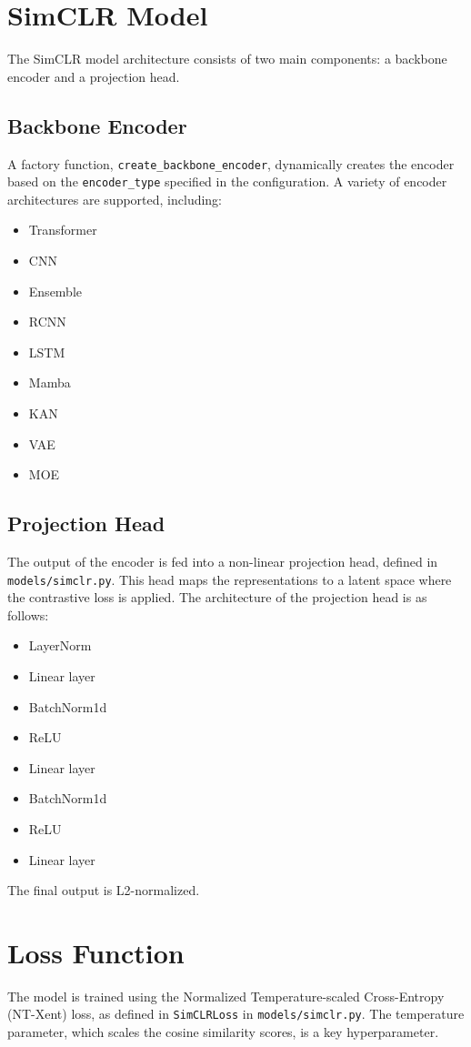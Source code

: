 \documentclass{article}
\begin{document}
\section{SimCLR Model}
The SimCLR model architecture consists of two main components: a backbone encoder and a projection head.

\subsection{Backbone Encoder}
A factory function, \texttt{create\_backbone\_encoder}, dynamically creates the encoder based on the \texttt{encoder\_type} specified in the configuration. A variety of encoder architectures are supported, including:
\begin{itemize}
    \item Transformer
    \item CNN
    \item Ensemble
    \item RCNN
    \item LSTM
    \item Mamba
    \item KAN
    \item VAE
    \item MOE
\end{itemize}

\subsection{Projection Head}
The output of the encoder is fed into a non-linear projection head, defined in \texttt{models/simclr.py}. This head maps the representations to a latent space where the contrastive loss is applied. The architecture of the projection head is as follows:
\begin{itemize}
    \item LayerNorm
    \item Linear layer
    \item BatchNorm1d
    \item ReLU
    \item Linear layer
    \item BatchNorm1d
    \item ReLU
    \item Linear layer
\end{itemize}
The final output is L2-normalized.

\section{Loss Function}
The model is trained using the Normalized Temperature-scaled Cross-Entropy (NT-Xent) loss, as defined in \texttt{SimCLRLoss} in \texttt{models/simclr.py}. The temperature parameter, which scales the cosine similarity scores, is a key hyperparameter.
\end{document}
